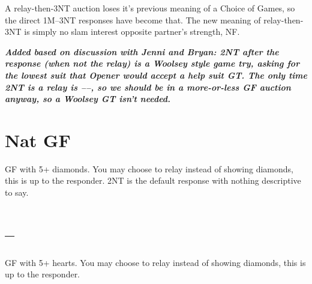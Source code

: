 \documentclass[tom-ari]{subfile}
\begin{document}
	A relay-then-3NT auction loses it's previous meaning of a Choice of Games, so the direct 1M--3NT responses have become that. The new meaning of relay-then-3NT is simply no slam interest opposite partner's strength, NF.
	
	\textbf{\textit{Added based on discussion with Jenni and Bryan:  2NT after the response (when not the relay) is a Woolsey style game try, asking for the lowest suit that Opener would accept a help suit GT.  The only time 2NT is a relay is ----, so we should be in a more-or-less GF auction anyway, so a Woolsey GT isn't needed.}}
	
	\reversemarginpar
	
	
	\section[2D Nat GF]{ Nat GF}
	
	GF with 5+ diamonds. You may choose to relay instead of showing diamonds, this is up to the responder. 2NT is the default response with nothing descriptive to say.
	
	
	\section[1S--2H]{--}
	
	GF with 5+ hearts. You may choose to relay instead of showing diamonds, this is up to the responder.
	
\end{document}

